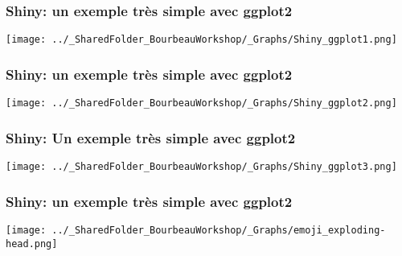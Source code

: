 \documentclass{beamer}
\begin{document}

    \begin{frame}
    
      \frametitle{Shiny: un exemple très simple avec ggplot2} \vspace{1cm}
      
        \begin{center}
      	  \texttt{[image: ../\_SharedFolder\_BourbeauWorkshop/\_Graphs/Shiny\_ggplot1.png]}
        \end{center} 
      
          
    \end{frame} 
    

    \begin{frame}
    
      \frametitle{Shiny: un exemple très simple avec ggplot2} \vspace{1cm}
      
        \begin{center}
      	  \texttt{[image: ../\_SharedFolder\_BourbeauWorkshop/\_Graphs/Shiny\_ggplot2.png]}
        \end{center} 
      
          
    \end{frame} 
    

    \begin{frame}
    
      \frametitle{Shiny: Un exemple très simple avec ggplot2} \vspace{1cm}
      
        \begin{center}
      	  \texttt{[image: ../\_SharedFolder\_BourbeauWorkshop/\_Graphs/Shiny\_ggplot3.png]}
        \end{center} 
      
          
    \end{frame} 
    

    \begin{frame}
    
      \frametitle{Shiny: un exemple très simple avec ggplot2} \vspace{1cm}
      
        \begin{center}
      	  \texttt{[image: ../\_SharedFolder\_BourbeauWorkshop/\_Graphs/emoji\_exploding-head.png]}
        \end{center} 
      
          
    \end{frame}     
    
\end{document}
